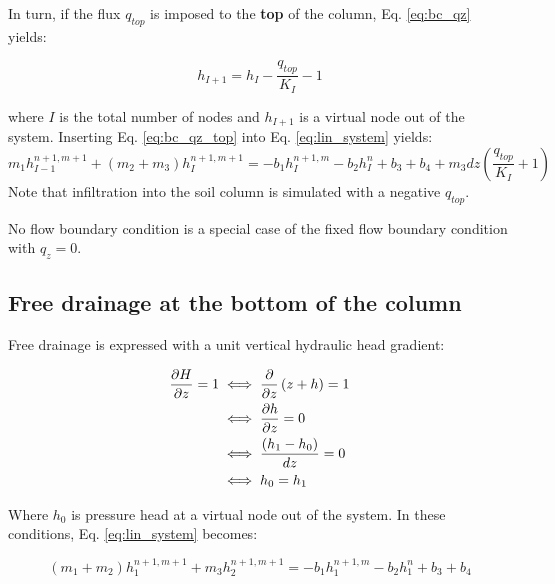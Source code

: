 \documentclass[a4paper,12pt]{article}
\begin{document}
In turn, if the flux $q_{top}$ is imposed to the \textbf{top} of the column, Eq. \ref{eq:bc_qz} yields:

\begin{equation} \label{eq:bc_qz_top}
    h_{I+1}  = h_I  - \frac{q_{top}}{K_I} - 1
\end{equation}

where $I$ is the total number of nodes and $h_{I+1}$ is a virtual node out of the system. Inserting Eq. \ref{eq:bc_qz_top} into Eq. \ref{eq:lin_system} yields: 
\begin{equation} \label{eq:bc_qz_lin_system_top}
    m_1 h_{I-1}^{n+1,m+1} + (m_2 + m_3) h_I^{n+1,m+1} = - b_1 h_I^{n+1,m} - b_2 h_I^n + b_3 + b_4 + m_3 dz \left( \frac{q_{top}}{K_I} +1 \right)
\end{equation}
Note that infiltration into the soil column is simulated with a negative $q_{top}$.


No flow boundary condition is a special case of the fixed flow boundary condition with $q_z = 0$.


\subsection{Free drainage at the bottom of the column}

Free drainage is expressed with a unit vertical hydraulic head gradient: 

\begin{align} \label{eq:bc_drain}
    \frac{\partial H}{\partial z} = 1 &\iff \frac{\partial}{\partial z} \left( z + h \right) =1 \nonumber \\
				      &\iff \frac{\partial h}{\partial z} = 0 \nonumber \\
				      &\iff {\left( h_1 - h_0 \right) \over dz}  = 0 \nonumber \\
				      &\iff h_0 = h_1 
\end{align}

Where $h_0$ is pressure head at a virtual node out of the system. In these conditions, Eq. \ref{eq:lin_system} becomes:

\begin{equation} \label{eq:bc_drain_sys}
    (m_1 + m_2) h_1^{n+1,m+1} + m_3 h_2^{n+1,m+1} = - b_1 h_1^{n+1,m} - b_2 h_1^n + b_3 + b_4
\end{equation}
\end{document}
